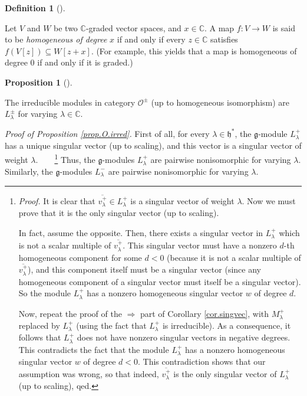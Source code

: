 \documentclass
[numbers=enddot,12pt,final,onecolumn,german,notitlepage]{scrartcl}%
\theoremstyle{definition}
\newtheorem{prop}[theo]{Proposition}
\newenvironment{proposition}[1][]
{\begin{prop}[#1]\begin{leftbar}}
{\end{leftbar}\end{prop}}
\newtheorem{defi}[theo]{Definition}
\newenvironment{definition}[1][]
{\begin{defi}[#1]\begin{leftbar}}
{\end{leftbar}\end{defi}}
\begin{document}
\begin{definition}
Let $V$ and $W$ be two $\mathbb{C}$-graded vector spaces, and $x\in\mathbb{C}%
$. A map $f:V\rightarrow W$ is said to be \textit{homogeneous of degree }$x$
if and only if every $z\in\mathbb{C}$ satisfies $f\left(  V\left[  z\right]
\right)  \subseteq W\left[  z+x\right]  $. (For example, this yields that a
map is homogeneous of degree $0$ if and only if it is graded.)
\end{definition}

\begin{proposition}
\label{prop.O.irred}The irreducible modules in category $\mathcal{O}^{\pm}$
(up to homogeneous isomorphism) are $L_{\lambda}^{\pm}$ for varying
$\lambda\in\mathbb{C}$.
\end{proposition}

\textit{Proof of Proposition \ref{prop.O.irred}.} First of all, for every
$\lambda\in\mathfrak{h}^{\ast}$, the $\mathfrak{g}$-module $L_{\lambda}^{+}$
has a unique singular vector (up to scaling), and this vector is a singular
vector of weight $\lambda$.\ \ \ \ \footnote{\textit{Proof.} It is clear that
$\overline{v_{\lambda}^{+}}\in L_{\lambda}^{+}$ is a singular vector of weight
$\lambda$. Now we must prove that it is the only singular vector (up to
scaling).
\par
In fact, assume the opposite. Then, there exists a singular vector in
$L_{\lambda}^{+}$ which is not a scalar multiple of $\overline{v_{\lambda}%
^{+}}$. This singular vector must have a nonzero $d$-th homogeneous component
for some $d<0$ (because it is not a scalar multiple of $\overline{v_{\lambda
}^{+}}$), and this component itself must be a singular vector (since any
homogeneous component of a singular vector must itself be a singular vector).
So the module $L_{\lambda}^{+}$ has a nonzero homogeneous singular vector $w$
of degree $d$.
\par
Now, repeat the proof of the $\Longrightarrow$ part of Corollary
\ref{cor.singvec}, with $M_{\lambda}^{+}$ replaced by $L_{\lambda}^{+}$ (using
the fact that $L_{\lambda}^{+}$ is irreducible). As a consequence, it follows
that $L_{\lambda}^{+}$ does not have nonzero singular vectors in negative
degrees. This contradicts the fact that the module $L_{\lambda}^{+}$ has a
nonzero homogeneous singular vector $w$ of degree $d<0$. This contradiction
shows that our assumption was wrong, so that indeed, $\overline{v_{\lambda
}^{+}}$ is the only singular vector of $L_{\lambda}^{+}$ (up to scaling),
qed.} Thus, the $\mathfrak{g}$-modules $L_{\lambda}^{+}$ are pairwise
nonisomorphic for varying $\lambda$. Similarly, the $\mathfrak{g}$-modules
$L_{\lambda}^{-}$ are pairwise nonisomorphic for varying $\lambda$.
\end{document}

